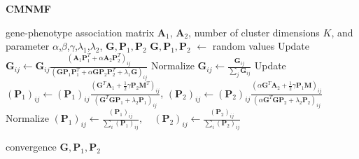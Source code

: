 \documentclass{bmcart}
\begin{document}
\begin{algorithm}[t]
\caption{\textbf{CMNMF}}\label{alg:CMNMF}
\renewcommand{\algorithmicrequire}{\textbf{Input:}}
\renewcommand{\algorithmicensure}{\textbf{Output:}}
\label{alg:pf}
\begin{algorithmic}[1]
\REQUIRE gene-phenotype association matrix $\bm{A}_1$, $\bm{A}_2$, number of cluster dimensions $K$, and parameter $\alpha$,$\beta$,$\gamma$,$\lambda_1$,$\lambda_2$,
\ENSURE {} ${\bm{G}}, {\bm{P}_1}, {\bm{P}_2}$
\STATE ${\bm{G}},{\bm{P}_1},{\bm{P}_2}$ $\leftarrow$ random values
\REPEAT
    \STATE Update $\bm{G}_{ij}\leftarrow \bm{G}_{ij}\frac{(\bm{A}_1\bm{P}_1^T+\alpha \bm{A}_2\bm{P}_2^T)_{ij}}{(\bm{G}\bm{P}_1\bm{P}_1^T+\alpha \bm{G}\bm{P}_2\bm{P}_2^T+\lambda_1\bm{G})_{ij}}$
    \STATE Normalize $\bm{G}_{ij}\leftarrow \frac{\bm{G}_{ij}}{\sum_{j}\bm{G}_{ij}}$
    \STATE Update $(\bm{P}_1)_{ij}\leftarrow (\bm{P}_1)_{ij}\frac{(\bm{G}^T\bm{A}_1+\frac{1}{2}\gamma \bm{P}_2\bm{M}^T)_{ij}}{(\bm{G}^T\bm{G}\bm{P}_1+\lambda_2\bm{P}_1)_{ij}}$,
    $(\bm{P}_2)_{ij}\leftarrow (\bm{P}_2)_{ij}\frac{(\alpha \bm{G}^T\bm{A}_2+\frac{1}{2}\gamma \bm{P}_1\bm{M})_{ij}}
{(\alpha \bm{G}^T\bm{G}\bm{P}_2 + \lambda_2\bm{P}_2)_{ij}}$
    \STATE Normalize $(\bm{P}_1)_{ij}\leftarrow \frac{(\bm{P}_1)_{ij}}{\sum_{i}(\bm{P}_1)_{ij}}, \quad
(\bm{P}_2)_{ij}\leftarrow \frac{(\bm{P}_2)_{ij}}{\sum_{i}(\bm{P}_2)_{ij}}$

\UNTIL convergence
\RETURN ${\bm{G}},{\bm{P}_1},{\bm{P}_2}$
\end{algorithmic}
\end{algorithm}
\end{document}

